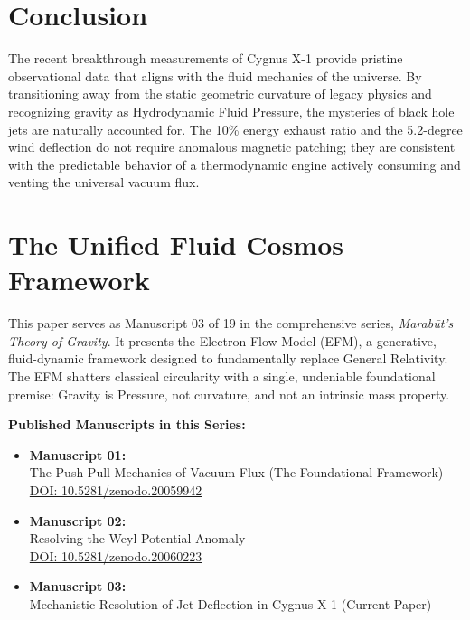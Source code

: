 \documentclass[11pt, a4paper]{article}
\newcommand{\doi}[1]{\href{https://doi.org/#1}{DOI: #1}}
\begin{document}
\section{Conclusion}
The recent breakthrough measurements of Cygnus X-1 provide pristine observational data that aligns with the fluid mechanics of the universe. By transitioning away from the static geometric curvature of legacy physics and recognizing gravity as Hydrodynamic Fluid Pressure, the mysteries of black hole jets are naturally accounted for. The 10\% energy exhaust ratio and the 5.2-degree wind deflection do not require anomalous magnetic patching; they are consistent with the predictable behavior of a thermodynamic engine actively consuming and venting the universal vacuum flux.

\clearpage
\section*{The Unified Fluid Cosmos Framework}
This paper serves as Manuscript 03 of 19 in the comprehensive series, \textit{Marab\={u}t's Theory of Gravity}. It presents the Electron Flow Model (EFM), a generative, fluid-dynamic framework designed to fundamentally replace General Relativity. The EFM shatters classical circularity with a single, undeniable foundational premise: Gravity is Pressure, not curvature, and not an intrinsic mass property.

\textbf{Published Manuscripts in this Series:}
\begin{itemize}
  \item \textbf{Manuscript 01:} \\ The Push-Pull Mechanics of Vacuum Flux (The Foundational Framework) \\ \doi{10.5281/zenodo.20059942}
  \item \textbf{Manuscript 02:} \\ Resolving the Weyl Potential Anomaly \\ \doi{10.5281/zenodo.20060223}
  \item \textbf{Manuscript 03:} \\ Mechanistic Resolution of Jet Deflection in Cygnus X-1 (Current Paper)
\end{itemize}
\end{document}
